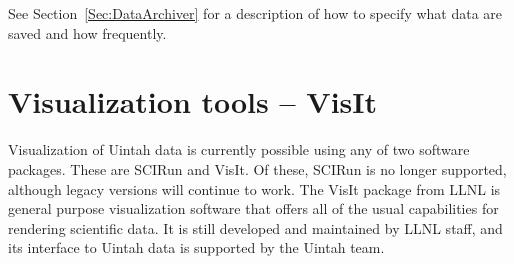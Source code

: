 See Section~\ref{Sec:DataArchiver} for a description of how to specify
what data are saved and how frequently.









\chapter{Visualization tools -- VisIt}

Visualization of Uintah data is currently possible using any of two
software packages.  These are SCIRun and VisIt.  Of these, SCIRun is
no longer supported, although legacy versions will continue to work.
The VisIt package from LLNL is general purpose visualization software
that offers all of the usual capabilities for rendering scientific
data.  It is still developed and maintained by LLNL staff, and its
interface to Uintah data is supported by the Uintah team. 



